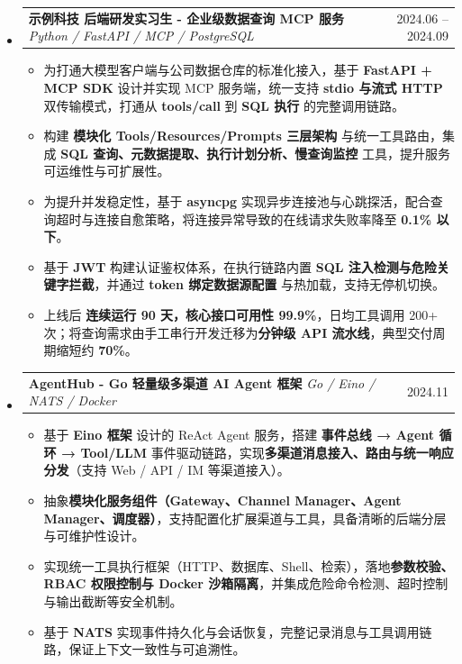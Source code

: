 \documentclass[a4paper,11pt]{article}
\makeatletter
\newcommand{\resumeProjectHeading}[3]{
  \item
  \begin{tabular*}{\linewidth}{@{}l@{\extracolsep{\fill}}r@{}}
    \colorbox{gray!20}{\textbf{#1}} \quad \textit{\small #2} & \small #3
  \end{tabular*}\vspace{0pt}
}
\newcommand{\resumeItem}[1]{\item \small{#1}}
\makeatother
\begin{document}
\begin{itemize}[label={},leftmargin=0pt]

\resumeProjectHeading
{示例科技 后端研发实习生 - 企业级数据查询 MCP 服务}
{Python / FastAPI / MCP / PostgreSQL}
{2024.06 -- 2024.09}
\begin{itemize}[label={$\bullet$},leftmargin=0.15in,topsep=0pt,itemsep=1pt]

  \resumeItem{为打通大模型客户端与公司数据仓库的标准化接入，基于 \textbf{FastAPI + MCP SDK} 设计并实现 MCP 服务端，统一支持 \textbf{stdio 与流式 HTTP} 双传输模式，打通从 \textbf{tools/call} 到 \textbf{SQL 执行} 的完整调用链路。}

  \resumeItem{构建 \textbf{模块化 Tools/Resources/Prompts 三层架构} 与统一工具路由，集成 \textbf{SQL 查询、元数据提取、执行计划分析、慢查询监控} 工具，提升服务可运维性与可扩展性。}

  \resumeItem{为提升并发稳定性，基于 \textbf{asyncpg} 实现异步连接池与心跳探活，配合查询超时与连接自愈策略，将连接异常导致的在线请求失败率降至 \textbf{0.1\% 以下}。}

  \resumeItem{基于 \textbf{JWT} 构建认证鉴权体系，在执行链路内置 \textbf{SQL 注入检测与危险关键字拦截}，并通过 \textbf{token 绑定数据源配置} 与热加载，支持无停机切换。}

  \resumeItem{上线后 \textbf{连续运行 90 天，核心接口可用性 99.9\%}，日均工具调用 200+ 次；将查询需求由手工串行开发迁移为\textbf{分钟级 API 流水线}，典型交付周期缩短约 \textbf{70\%}。}

\end{itemize}
\resumeProjectHeading
{AgentHub - Go 轻量级多渠道 AI Agent 框架}
{Go / Eino / NATS / Docker}
{2024.11}
\begin{itemize}[label={$\bullet$},leftmargin=0.15in,topsep=0pt,itemsep=1pt]
  \resumeItem{基于 \textbf{Eino 框架} 设计的 ReAct Agent 服务，搭建 \textbf{事件总线 → Agent 循环 → Tool/LLM} 事件驱动链路，实现\textbf{多渠道消息接入、路由与统一响应分发}（支持 Web / API / IM 等渠道接入）。}

  \resumeItem{抽象\textbf{模块化服务组件（Gateway、Channel Manager、Agent Manager、调度器）}，支持配置化扩展渠道与工具，具备清晰的后端分层与可维护性设计。}

  \resumeItem{实现统一工具执行框架（HTTP、数据库、Shell、检索），落地\textbf{参数校验、RBAC 权限控制与 Docker 沙箱隔离}，并集成危险命令检测、超时控制与输出截断等安全机制。}

  \resumeItem{基于 \textbf{NATS} 实现事件持久化与会话恢复，完整记录消息与工具调用链路，保证上下文一致性与可追溯性。}


\end{itemize}
\end{itemize}
\end{document}
